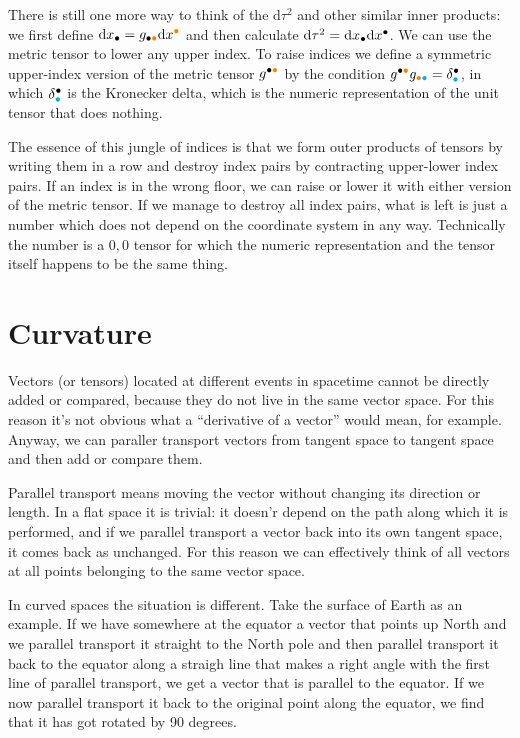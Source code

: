 \documentclass[11pt,oneside%
]{memoir}
\newcommand{\dd}{\mathrm{d}}
\newcommand{\coa}{{\color{black}\bullet}}
\newcommand{\cob}{{\color{oranssi}\bullet}}
\newcommand{\coc}{{\color{cyan}\bullet}}
\begin{document}
There is still one more way to think of the \(\dd\tau^2\) and other similar inner products: we first define \(\dd x_\coa=g_{\coa\cob}\dd x^\cob\) and then calculate \(\dd\tau^2=\dd x_\coa\dd x^\coa\). We can use the metric tensor to lower any upper index. To raise indices we define a symmetric upper-index version of the metric tensor \(g^{\coa\cob}\) by the condition \(g^{\coa\cob}g_{\cob\coc}=\delta^{\coa}_{\coc}\), in which \(\delta^{\coa}_{\coc}\) is the Kronecker delta, which is the numeric representation of the unit tensor that does nothing. 

The essence of this jungle of indices is that we form outer products of tensors by writing them in a row and destroy index pairs by contracting upper-lower index pairs. If an index is in the wrong floor, we can raise or lower it with either version of the metric tensor. If we manage to destroy all index pairs, what is left is just a number which does not depend on the coordinate system in any way. Technically the number is a \(0,0\) tensor for which the numeric representation and the tensor itself happens to be the same thing.

\section{Curvature}

Vectors (or tensors) located at different events in spacetime cannot be directly added or compared, because they do not live in the same vector space. For this reason it's not obvious what a ``derivative of a vector'' would mean, for example. Anyway, we can paraller transport vectors from tangent space to tangent space and then add or compare them.

Parallel transport means moving the vector without changing its direction or length. In a flat space it is trivial: it doesn'r depend on the path along which it is performed, and if we parallel transport a vector back into its own tangent space, it comes back as unchanged. For this reason we can effectively think of all vectors at all points belonging to the same vector space.

In curved spaces the situation is different. Take the surface of Earth as an example. If we have somewhere at the equator a vector that points up North and we parallel transport it straight to the North pole and then parallel transport it back to the equator along a straigh line that makes a right angle with the first line of parallel transport, we get a vector that is parallel to the equator. If we now parallel transport it back to the original point along the equator, we find that it has got rotated by 90 degrees.
\end{document}
